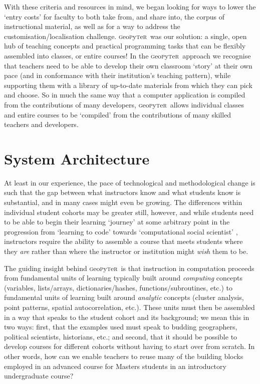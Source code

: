 \documentclass[letter, 11pt]{article}
\newcommand{\gp}{\textsc{g}eo\textsc{p}y\textsc{t}e\textsc{r}~\/}
\begin{document}
With these criteria and resources in mind, we began looking for ways to lower the `entry costs' for faculty to both take from, and share into, the corpus of instructional material, as well as for a way to address the customisation/localisation challenge. \gp was our solution: a single, open hub of teaching concepts and practical programming tasks that can be flexibly assembled into classes, or entire courses! In the \gp approach we recognise that teachers need to be able to develop their own classroom `story' at their own pace (and in conformance with their institution's teaching pattern), while supporting them with a library of up-to-date materials from which they can pick and choose. So in much the same way that a computer application is compiled from the contributions of many developers, \gp allows individual classes and entire courses to be `compiled' from the contributions of many skilled teachers and developers. 

\section{System Architecture}\label{system-architecture}

At least in our experience, the pace of technological and methodological change is such that the gap between what instructors know and what students know is substantial, and in many cases might even be growing. The differences within individual student cohorts may be greater still, however, and while students need to be able to begin their learning `journey' at some arbitrary point in the progression from `learning to code' towards `computational social scientist' \citep{Lazer2009}, instructors require the ability to assemble a course that meets students where they \emph{are} rather than where the instructor or institution might \emph{wish} them to be.

The guiding insight behind \gp is that instruction in computation proceeds from fundamental units of learning typically built around \textit{computing} concepts (variables, lists/arrays, dictionaries/hashes, functions/subroutines, etc.) to fundamental units of learning built around \textit{analytic} concepts (cluster analysis, point patterns, spatial autocorrelation, etc.). These units must then be assembled in a way that speaks to the student cohort and its background; we mean this in two ways: first, that the examples used must speak to budding geographers, political scientists, historians, etc.; and second, that it should be possible to develop courses for different cohorts without having to start over from scratch. In other words, how can we enable teachers to reuse many of the building blocks employed in an advanced course for Masters students in an introductory undergraduate course?
\end{document}
